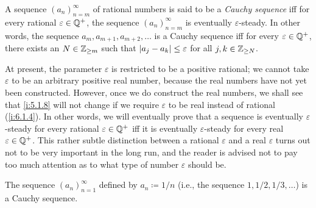 \setcounter{thm}{7}
\begin{defn}\label{i:5.1.8}
  A sequence \((a_n)_{n = m}^{\infty}\) of rational numbers is said to be a \emph{Cauchy sequence} iff for every rational \(\varepsilon \in \mathbb{Q}^+\), the sequence \((a_n)_{n = m}^{\infty}\) is eventually \(\varepsilon\)-steady.
  In other words, the sequence \(a_m, a_{m + 1}, a_{m + 2}, \dots\) is a Cauchy sequence iff for every \(\varepsilon \in \mathbb{Q}^+\), there exists an \(N \in \mathbb{Z}_{\geq m}\) such that \(\left\lvert a_j - a_k\right\rvert \leq \varepsilon\) for all \(j, k \in \mathbb{Z}_{\geq N}\).
\end{defn}

\begin{rmk}\label{i:5.1.9}
  At present, the parameter \(\varepsilon\) is restricted to be a positive rational;
  we cannot take \(\varepsilon\) to be an arbitrary positive real number, because the real numbers have not yet been constructed.
  However, once we do construct the real numbers, we shall see that \cref{i:5.1.8} will not change if we require \(\varepsilon\) to be real instead of rational (\cref{i:6.1.4}).
  In other words, we will eventually prove that a sequence is eventually \(\varepsilon\)-steady for every rational \(\varepsilon \in \mathbb{Q}^+\) iff it is eventually \(\varepsilon\)-steady for every real \(\varepsilon \in \mathbb{Q}^+\).
  This rather subtle distinction between a rational \(\varepsilon\) and a real \(\varepsilon\) turns out not to be very important in the long run, and the reader is advised not to pay too much attention as to what type of number \(\varepsilon\) should be.
\end{rmk}

\setcounter{thm}{10}
\begin{prop}\label{i:5.1.11}
  The sequence \((a_n)_{n = 1}^\infty\) defined by \(a_n \coloneqq 1 / n\) (i.e., the sequence \(1, 1 / 2, 1 / 3, \dots\)) is a Cauchy sequence.
\end{prop}

